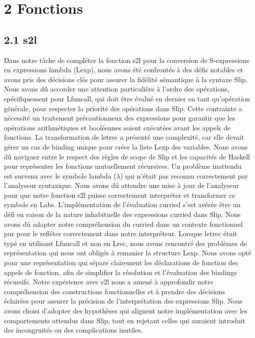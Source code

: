 \documentclass[10pt]{article}
\begin{document}
\section*{2 Fonctions}
\subsection*{2.1 s2l}
Dans notre tâche de compléter la fonction s2l pour la conversion de S-expressions en expressions lambda (Lexp), nous avons été confrontés à des défis notables et avons pris des décisions clés pour assurer la fidélité sémantique à la syntaxe Slip. Nous avons dû accorder une attention particulière à l'ordre des opérations, spécifiquement pour Lfuncall, qui doit être évalué en dernier en tant qu'opération générale, pour respecter la priorité des opérations dans Slip. Cette contrainte a nécessité un traitement précautionneux des expressions pour garantir que les opérations arithmétiques et booléennes soient exécutées avant les appels de fonctions. La transformation de letrec a présenté une complexité, car elle devait gérer un cas de binding unique pour créer la liste Lexp des variables. Nous avons dû naviguer entre le respect des règles de scope de Slip et les capacités de Haskell pour représenter les fonctions mutuellement récursives. Un problème inattendu est survenu avec le symbole lambda ($\lambda$) qui n'était pas reconnu correctement par l'analyseur syntaxique. Nous avons dû attendre une mise à jour de l'analyseur pour que notre fonction s2l puisse correctement interpréter et transformer ce symbole en Labs. L'implémentation de l'évaluation curried s'est avérée être un défi en raison de la nature inhabituelle des expressions curried dans Slip. Nous avons dû adapter notre compréhension du curried dans un contexte fonctionnel pur pour le refléter correctement dans notre interpréteur. Lorsque letrec était typé en utilisant Lfuncall et non en Lrec, nous avons rencontré des problèmes de représentation qui nous ont obligés à remanier la structure Lexp. Nous avons opté pour une représentation qui sépare clairement les déclarations de fonction des appels de fonction, afin de simplifier la résolution et l'évaluation des bindings récursifs. Notre expérience avec s2l nous a amené à approfondir notre compréhension des constructions fonctionnelles et à prendre des décisions éclairées pour assurer la précision de l'interprétation des expressions Slip. Nous avons choisi d'adopter des hypothèses qui alignent notre implémentation avec les comportements attendus dans Slip, tout en rejetant celles qui auraient introduit des incongruités ou des complications inutiles.
\end{document}
